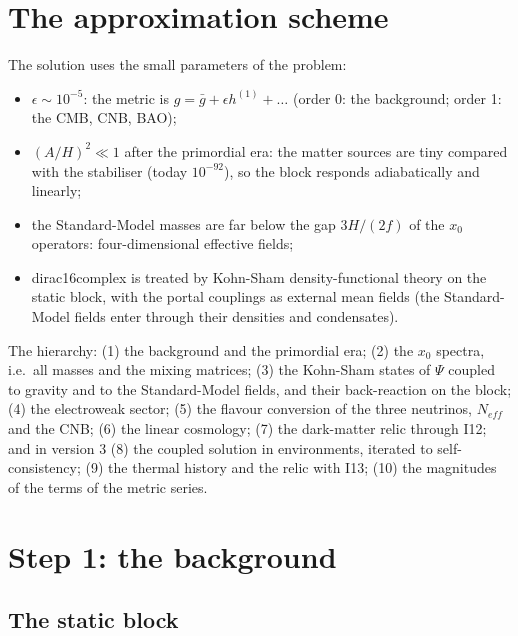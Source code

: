 \documentclass[
  10pt,
]{article}
\providecommand{\tightlist}{%
  \setlength{\itemsep}{0pt}\setlength{\parskip}{0pt}}
\begin{document}
\hypertarget{the-approximation-scheme}{%
\section{The approximation scheme}\label{the-approximation-scheme}}

The solution uses the small parameters of the problem:

\begin{itemize}
\tightlist
\item
  \(\epsilon \sim 10^{-5}\): the metric is
  \(g = \bar g + \epsilon h^{(1)} + \dots\) (order 0: the background;
  order 1: the CMB, CNB, BAO);
\item
  \((A/H)^2 \ll 1\) after the primordial era: the matter sources are
  tiny compared with the stabiliser (today \(10^{-92}\)), so the block
  responds adiabatically and linearly;
\item
  the Standard-Model masses are far below the gap \(3H/(2f)\) of the
  \(x_0\) operators: four-dimensional effective fields;
\item
  dirac16complex is treated by Kohn-Sham density-functional theory on
  the static block, with the portal couplings as external mean fields
  (the Standard-Model fields enter through their densities and
  condensates).
\end{itemize}

The hierarchy: (1) the background and the primordial era; (2) the
\(x_0\) spectra, i.e.~all masses and the mixing matrices; (3) the
Kohn-Sham states of \(\Psi\) coupled to gravity and to the
Standard-Model fields, and their back-reaction on the block; (4) the
electroweak sector; (5) the flavour conversion of the three neutrinos,
\(N_{eff}\) and the CNB; (6) the linear cosmology; (7) the dark-matter
relic through I12; and in version 3 (8) the coupled solution in
environments, iterated to self-consistency; (9) the thermal history and
the relic with I13; (10) the magnitudes of the terms of the metric
series.

\hypertarget{step-1-the-background}{%
\section{Step 1: the background}\label{step-1-the-background}}

\hypertarget{the-static-block}{%
\subsection{The static block}\label{the-static-block}}
\end{document}
